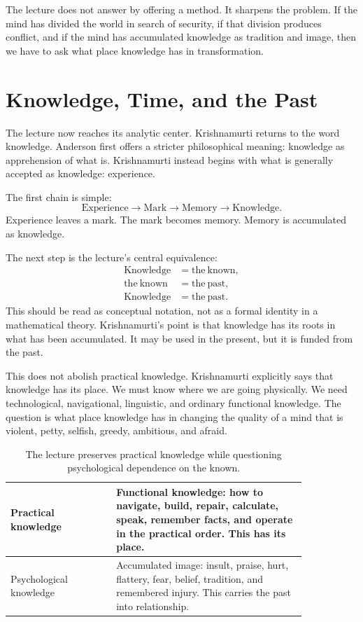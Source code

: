 The lecture does not answer by offering a method. It sharpens the problem. If the mind has divided the world in search of security, if that division produces conflict, and if the mind has accumulated knowledge as tradition and image, then we have to ask what place knowledge has in transformation.

\section{Knowledge, Time, and the Past}

The lecture now reaches its analytic center. Krishnamurti returns to the word knowledge. Anderson first offers a stricter philosophical meaning: knowledge as apprehension of what is. Krishnamurti instead begins with what is generally accepted as knowledge: experience.

The first chain is simple:
\begin{equation}
\mathrm{Experience}
\longrightarrow
\mathrm{Mark}
\longrightarrow
\mathrm{Memory}
\longrightarrow
\mathrm{Knowledge}.
\end{equation}
Experience leaves a mark. The mark becomes memory. Memory is accumulated as knowledge.

The next step is the lecture's central equivalence:
\begin{align}
\mathrm{Knowledge} &= \mathrm{the\ known},\\
\mathrm{the\ known} &= \mathrm{the\ past},\\
\mathrm{Knowledge} &= \mathrm{the\ past}.
\end{align}
This should be read as conceptual notation, not as a formal identity in a mathematical theory. Krishnamurti's point is that knowledge has its roots in what has been accumulated. It may be used in the present, but it is funded from the past.

This does not abolish practical knowledge. Krishnamurti explicitly says that knowledge has its place. We must know where we are going physically. We need technological, navigational, linguistic, and ordinary functional knowledge. The question is what place knowledge has in changing the quality of a mind that is violent, petty, selfish, greedy, ambitious, and afraid.

\begin{table}
\centering
\begin{tabular}{|p{0.30\linewidth}|p{0.54\linewidth}|}
\hline
Practical knowledge & Functional knowledge: how to navigate, build, repair, calculate, speak, remember facts, and operate in the practical order. This has its place.\\
\hline
Psychological knowledge & Accumulated image: insult, praise, hurt, flattery, fear, belief, tradition, and remembered injury. This carries the past into relationship.\\
\hline
\end{tabular}
\caption{The lecture preserves practical knowledge while questioning psychological dependence on the known.}
\end{table}

